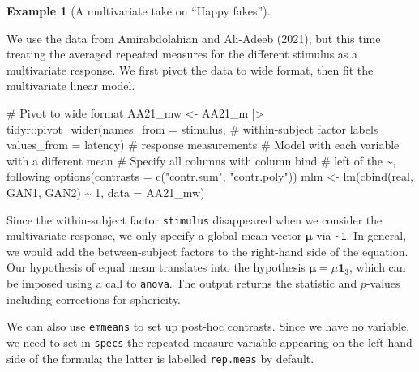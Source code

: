 \documentclass[
  11pt,
  letterpaper,
]{scrbook}
\newenvironment{Shaded}{\begin{snugshade}}{\end{snugshade}}
\newcommand{\AttributeTok}[1]{\textcolor[rgb]{0.40,0.45,0.13}{#1}}
\newcommand{\CommentTok}[1]{\textcolor[rgb]{0.37,0.37,0.37}{#1}}
\newcommand{\DecValTok}[1]{\textcolor[rgb]{0.68,0.00,0.00}{#1}}
\newcommand{\FunctionTok}[1]{\textcolor[rgb]{0.28,0.35,0.67}{#1}}
\newcommand{\NormalTok}[1]{\textcolor[rgb]{0.00,0.23,0.31}{#1}}
\newcommand{\OtherTok}[1]{\textcolor[rgb]{0.00,0.23,0.31}{#1}}
\newcommand{\SpecialCharTok}[1]{\textcolor[rgb]{0.37,0.37,0.37}{#1}}
\newcommand{\StringTok}[1]{\textcolor[rgb]{0.13,0.47,0.30}{#1}}
\theoremstyle{definition}
\newtheorem{example}{Example}[chapter]
\theoremstyle{remark}
\begin{document}
\begin{example}[A multivariate take on ``Happy
fakes'']\protect\hypertarget{exm-happyfakemulti}{}\label{exm-happyfakemulti}

We use the data from Amirabdolahian and Ali-Adeeb (2021), but this time
treating the averaged repeated measures for the different stimulus as a
multivariate response. We first pivot the data to wide format, then fit
the multivariate linear model.

\begin{Shaded}
\begin{Highlighting}[]
\CommentTok{\# Pivot to wide format}
\NormalTok{AA21\_mw }\OtherTok{\textless{}{-}}\NormalTok{ AA21\_m }\SpecialCharTok{|\textgreater{}}
\NormalTok{  tidyr}\SpecialCharTok{::}\FunctionTok{pivot\_wider}\NormalTok{(}\AttributeTok{names\_from =}\NormalTok{ stimulus, }\CommentTok{\# within{-}subject factor labels}
                     \AttributeTok{values\_from =}\NormalTok{ latency) }\CommentTok{\# response measurements }
\CommentTok{\# Model with each variable with a different mean}
\CommentTok{\# Specify all columns with column bind }
\CommentTok{\# left of the \textasciitilde{}, following }
\FunctionTok{options}\NormalTok{(}\AttributeTok{contrasts =} \FunctionTok{c}\NormalTok{(}\StringTok{"contr.sum"}\NormalTok{, }\StringTok{"contr.poly"}\NormalTok{))}
\NormalTok{mlm }\OtherTok{\textless{}{-}} \FunctionTok{lm}\NormalTok{(}\FunctionTok{cbind}\NormalTok{(real, GAN1, GAN2) }\SpecialCharTok{\textasciitilde{}} \DecValTok{1}\NormalTok{,}
          \AttributeTok{data =}\NormalTok{ AA21\_mw)}
\end{Highlighting}
\end{Shaded}

Since the within-subject factor \texttt{stimulus} disappeared when we
consider the multivariate response, we only specify a global mean vector
\(\boldsymbol{\mu}\) via \texttt{\textasciitilde{}1}. In general, we
would add the between-subject factors to the right-hand side of the
equation. Our hypothesis of equal mean translates into the hypothesis
\(\boldsymbol{\mu} = \mu\boldsymbol{1}_3\), which can be imposed using a
call to \texttt{anova}. The output returns the statistic and
\(p\)-values including corrections for sphericity.

We can also use \texttt{emmeans} to set up post-hoc contrasts. Since we
have no variable, we need to set in \texttt{specs} the repeated measure
variable appearing on the left hand side of the formula; the latter is
labelled \texttt{rep.meas} by default.


\end{example}
\end{document}
